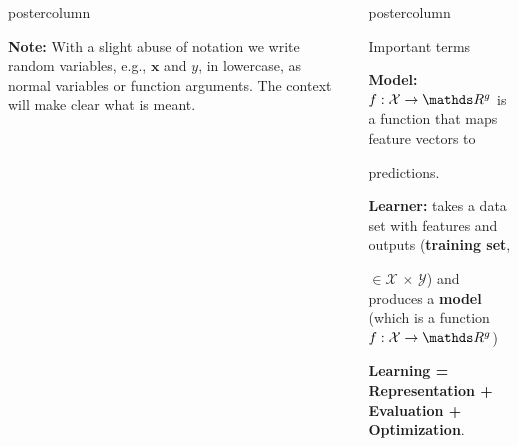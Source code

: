 \documentclass{beamer}
\newlength{\columnheight} %
\begin{document}
\begin{frame}[fragile]{}
\begin{columns}
\begin{column}{.31\textwidth}
\begin{beamercolorbox}[center]{postercolumn}
\begin{minipage}{.98\textwidth}
{\begin{myblock}{}
						\textbf{Note:} With a slight abuse of notation we write random variables, e.g., $\mathbf{x}$ and $y$, in lowercase, as normal variables or function arguments. The context will make clear what is meant.
						\end{myblock}
				}
			\end{minipage}
		\end{beamercolorbox}
	\end{column}
	\begin{column}{.31\textwidth}
		\begin{beamercolorbox}[center]{postercolumn}
			\begin{minipage}{.98\textwidth}
				\parbox[t][\columnheight]{\textwidth}{
				    \begin{myblock}{Important terms}
				        \begin{codebox}
						    \textbf{Model: }$f : \Xspace \rightarrow \R^g$ is a function that maps feature vectors to 
						\end{codebox}
						\begin{codebox}
						    predictions.
						\end{codebox}
            \vspace*{0.5ex}
						\begin{codebox}
						\textbf{Learner: } takes a data set with features and outputs (\textbf{training set},
						\end{codebox}
						\begin{codebox}
						$\in \mathcal{X}\, \times \,\mathcal{Y}$)  and produces a \textbf{model} (which is a function $f : \Xspace \rightarrow \R^g$)
						\end{codebox}
						
            \vspace*{0.5ex}
						\begin{codebox}
						    \textbf{Learning = Representation + Evaluation  + Optimization}.
						\end{codebox}
						

\end{myblock}}
\end{minipage}
\end{beamercolorbox}
\end{column}
\end{columns}
\end{frame}
\end{document}
